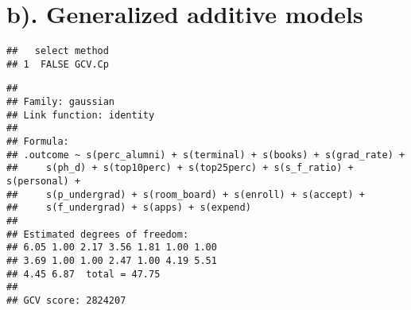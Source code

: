 \documentclass[
]{article}
\newenvironment{Shaded}{\begin{snugshade}}{\end{snugshade}}
\newcommand{\AttributeTok}[1]{\textcolor[rgb]{0.77,0.63,0.00}{#1}}
\newcommand{\CommentTok}[1]{\textcolor[rgb]{0.56,0.35,0.01}{\textit{#1}}}
\newcommand{\DecValTok}[1]{\textcolor[rgb]{0.00,0.00,0.81}{#1}}
\newcommand{\FunctionTok}[1]{\textcolor[rgb]{0.00,0.00,0.00}{#1}}
\newcommand{\NormalTok}[1]{#1}
\newcommand{\OtherTok}[1]{\textcolor[rgb]{0.56,0.35,0.01}{#1}}
\newcommand{\SpecialCharTok}[1]{\textcolor[rgb]{0.00,0.00,0.00}{#1}}
\newcommand{\StringTok}[1]{\textcolor[rgb]{0.31,0.60,0.02}{#1}}
\begin{document}
\hypertarget{b.-generalized-additive-models}{%
\section{b). Generalized additive
models}\label{b.-generalized-additive-models}}

\begin{Shaded}
\end{Shaded}

\begin{verbatim}
##   select method
## 1  FALSE GCV.Cp
\end{verbatim}

\begin{Shaded}
\end{Shaded}

\begin{verbatim}
## 
## Family: gaussian 
## Link function: identity 
## 
## Formula:
## .outcome ~ s(perc_alumni) + s(terminal) + s(books) + s(grad_rate) + 
##     s(ph_d) + s(top10perc) + s(top25perc) + s(s_f_ratio) + s(personal) + 
##     s(p_undergrad) + s(room_board) + s(enroll) + s(accept) + 
##     s(f_undergrad) + s(apps) + s(expend)
## 
## Estimated degrees of freedom:
## 6.05 1.00 2.17 3.56 1.81 1.00 1.00 
## 3.69 1.00 1.00 2.47 1.00 4.19 5.51 
## 4.45 6.87  total = 47.75 
## 
## GCV score: 2824207
\end{verbatim}
\end{document}
